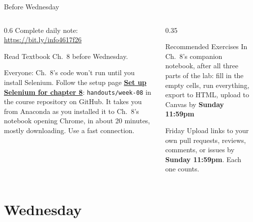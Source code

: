 \documentclass[9pt,aspectratio=169]{beamer}
\begin{document}
\begin{frame}{Before Wednesday}
    \begin{columns}[T]
        \begin{column}{0.6\textwidth}
            Complete daily note: \url{https://bit.ly/info4617f26}

            \medskip
            Read Textbook Ch.~8 before Wednesday.

            \medskip
            Everyone: Ch.~8's code won't run until you install Selenium. Follow the setup page \href{https://github.com/cuinfoscience/INFO4617-Fall2026/tree/main/handouts/week-08}{\textbf{Set up Selenium for chapter 8}}: \texttt{handouts/week-08} in the course repository on GitHub. It takes you from Anaconda as you installed it to Ch.~8's notebook opening Chrome, in about 20 minutes, mostly downloading. Use a fast connection.
        \end{column}
        \begin{column}{0.35\textwidth}
            \begin{alertblock}{Recommended Exercises}
                \small In Ch.~8's companion notebook, after all three parts of the lab: fill in the empty cells, run everything, export to HTML, upload to Canvas by \textbf{Sunday 11:59pm}
            \end{alertblock}
            \begin{alertblock}{Friday}
                \small Upload links to your own pull requests, reviews, comments, or issues by \textbf{Sunday 11:59pm}. Each one counts.
            \end{alertblock}
        \end{column}
    \end{columns}
\end{frame}

\section{Wednesday}
\end{document}

